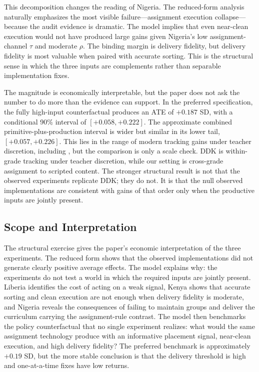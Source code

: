 \documentclass[11pt]{article}
\begin{document}


This decomposition changes the reading of Nigeria. The reduced-form analysis naturally emphasizes the most visible failure---assignment execution collapse---because the audit evidence is dramatic. The model implies that even near-clean execution would not have produced large gains given Nigeria's low assignment-channel $\tau$ and moderate $\rho$. The binding margin is delivery fidelity, but delivery fidelity is most valuable when paired with accurate sorting. This is the structural sense in which the three inputs are complements rather than separable implementation fixes.

The magnitude is economically interpretable, but the paper does not ask the number to do more than the evidence can support. In the preferred specification, the fully high-input counterfactual produces an ATE of $+0.187$ SD, with a conditional 90\% interval of $[+0.058,+0.222]$. The approximate combined primitive-plus-production interval is wider but similar in its lower tail, $[+0.057,+0.226]$. This lies in the range of modern tracking gains under teacher discretion, including \citet{duflo2011peer}, but the comparison is only a scale check. DDK is within-grade tracking under teacher discretion, while our setting is cross-grade assignment to scripted content. The stronger structural result is not that the observed experiments replicate DDK; they do not. It is that the null observed implementations are consistent with gains of that order only when the productive inputs are jointly present.

\subsection{Scope and Interpretation}
\label{subsec:struct_limits}

The structural exercise gives the paper's economic interpretation of the three experiments. The reduced form shows that the observed implementations did not generate clearly positive average effects. The model explains why: the experiments do not test a world in which the required inputs are jointly present. Liberia identifies the cost of acting on a weak signal, Kenya shows that accurate sorting and clean execution are not enough when delivery fidelity is moderate, and Nigeria reveals the consequences of failing to maintain groups and deliver the curriculum carrying the assignment-rule contrast. The model then benchmarks the policy counterfactual that no single experiment realizes: what would the same assignment technology produce with an informative placement signal, near-clean execution, and high delivery fidelity? The preferred benchmark is approximately $+0.19$ SD, but the more stable conclusion is that the delivery threshold is high and one-at-a-time fixes have low returns.
\end{document}
